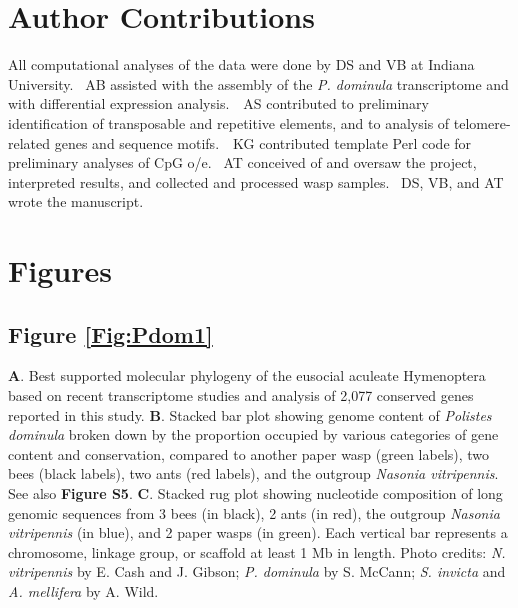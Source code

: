 \section{Author Contributions}

All computational analyses of the data were done by DS and VB at Indiana
University.~ AB assisted with the assembly of the \textit{P. dominula}
transcriptome and with differential expression analysis.~~AS contributed
to preliminary identification of transposable and repetitive elements,
and to analysis of telomere-related genes and sequence motifs.~~KG
contributed template Perl code for preliminary analyses of CpG o/e.~ AT
conceived of and oversaw the project, interpreted results, and collected
and processed wasp samples.~ DS, VB, and AT wrote the manuscript.

\section{Figures}

\subsection*{Figure \ref{Fig:Pdom1}}
\noindent
\textbf{A}. Best supported molecular phylogeny of the eusocial aculeate Hymenoptera based on recent transcriptome studies and analysis of 2,077 conserved genes reported in this study.
\textbf{B}. Stacked bar plot showing genome content of \textit{Polistes dominula} broken down by the proportion occupied by various categories of gene content and conservation, compared to another paper wasp (green labels), two bees (black labels), two ants (red labels), and the outgroup \textit{Nasonia vitripennis}. See also \textbf{Figure S5}.
\textbf{C}. Stacked rug plot showing nucleotide composition of long genomic sequences from 3 bees (in black), 2 ants (in red), the outgroup
\textit{Nasonia vitripennis} (in blue), and 2 paper wasps (in green). Each vertical bar represents a chromosome, linkage group, or scaffold at least 1 Mb in length.
Photo credits: \textit{N. vitripennis} by E. Cash and J. Gibson;
\textit{P. dominula} by S. McCann; \textit{S. invicta} and \textit{A. mellifera} by A. Wild.


